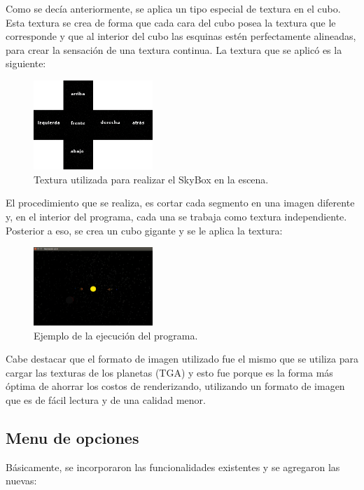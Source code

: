 \documentclass[journal]{IEEEtran}
\begin{document}
Como se decía anteriormente, se aplica un tipo especial de textura en el cubo. Esta textura se crea de forma que cada cara del cubo posea la textura que le corresponde y que al interior del cubo las esquinas estén perfectamente alineadas, para crear la sensación de una textura continua. La textura que se aplicó es la siguiente:

\begin{figure}[h!]
	\includegraphics[width=0.4\textwidth, height=0.25\textwidth]{skybox.png}
	\centering
	\caption{Textura utilizada para realizar el SkyBox en la escena.}
\end{figure}

El procedimiento que se realiza, es cortar cada segmento en una imagen diferente y, en el interior del programa, cada una se trabaja como textura independiente. Posterior a eso, se crea un cubo gigante y se le aplica la textura:

\begin{figure}[h!]
	\includegraphics[width=0.4\textwidth, height=0.25\textwidth]{skybox_example.png}
	\centering
	\caption{Ejemplo de la ejecución del programa.}
\end{figure}

Cabe destacar que el formato de imagen utilizado fue el mismo que se utiliza para cargar las texturas de los planetas (TGA) y esto fue porque es la forma más óptima de ahorrar los costos de renderizando, utilizando un formato de imagen que es de fácil lectura y de una calidad menor.

\subsection{Menu de opciones}

Básicamente, se incorporaron las funcionalidades existentes y se agregaron las nuevas:
\end{document}
